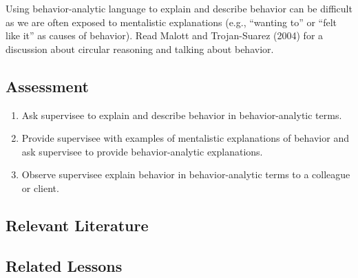 Using behavior-analytic language to explain and describe behavior can be difficult as we are often exposed to mentalistic explanations (e.g., ``wanting to'' or ``felt like it'' as causes of behavior).  Read Malott and Trojan-Suarez (2004) for a discussion about circular reasoning and talking about behavior.

\subsection{Assessment}
\begin{enumerate}
\item Ask supervisee to explain and describe behavior in behavior-analytic terms.
\item Provide supervisee with examples of mentalistic explanations of behavior and ask supervisee to provide behavior-analytic explanations.
\item Observe supervisee explain behavior in behavior-analytic terms to a colleague or client.
%
\end{enumerate}
%
\subsection{Relevant Literature}
\begin{refsection}
\nocite{cooper2007applied,
        malott2008principles,
        moore2008conceptual}
\printbibliography[heading=none]
\end{refsection}
%
\subsection{Related Lessons}
\fourFKSeven{}\\
\fourFKEight{}\\
\fourFKThirtyOne{}\\
\fourFKThirtyThree{}\\
\fourgFour{}\\
\fouriOne{}\\
\fouriTwo{}\\
